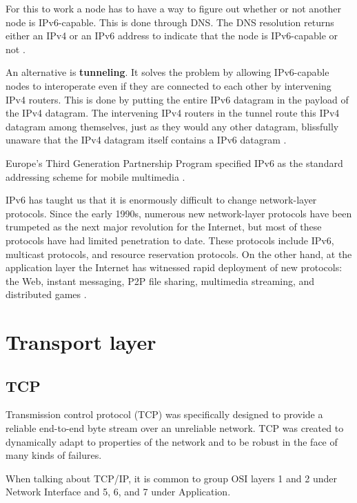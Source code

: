 For this to work a node has to have a way to figure out whether or not another node is IPv6-capable. This is done through DNS. The DNS resolution returns either an IPv4 or an IPv6 address to indicate that the node is IPv6-capable or not \cite[p.~360]{computer-networking-kurose-2012}.

An alternative is \textbf{tunneling}. It solves the problem by allowing IPv6-capable nodes to interoperate even if they are connected to each other by intervening IPv4 routers. This is done by putting the entire IPv6 datagram in the payload of the IPv4 datagram. The intervening IPv4 routers in the tunnel route this IPv4 datagram among themselves, just as they would any other datagram, blissfully unaware that the IPv4 datagram itself contains a IPv6 datagram \cite[p.~360]{computer-networking-kurose-2012}.

Europe's Third Generation Partnership Program specified IPv6 as the standard addressing scheme for mobile multimedia \cite[p.~362]{computer-networking-kurose-2012}.

IPv6 has taught us that it is enormously difficult to change network-layer protocols. Since the early 1990s, numerous new network-layer protocols have been trumpeted as the next major revolution for the
Internet, but most of these protocols have had limited penetration to date.
These protocols include IPv6, multicast protocols, and resource reservation protocols.
On the other hand, at the application layer the Internet has witnessed rapid deployment of new protocols: the Web, instant messaging, P2P file sharing, multimedia streaming, and distributed games \cite[p.~362]{computer-networking-kurose-2012}.

\section{Transport layer}

\subsection{TCP}

Transmission control protocol (TCP) was specifically designed to provide a reliable end-to-end byte stream over an unreliable network.
TCP was created to dynamically adapt to properties of the network and to be robust in the face of many kinds of failures.

When talking about TCP/IP, it is common to group OSI layers 1 and 2 under Network Interface and 5, 6, and 7 under Application.


